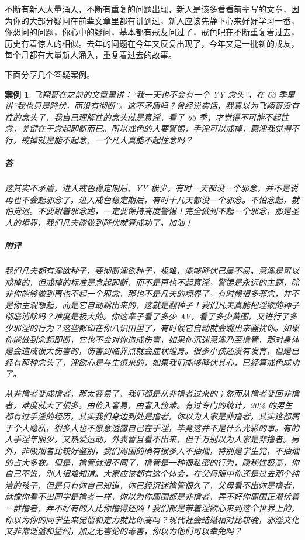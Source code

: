 \documentclass{ctexart}
\newtheorem{case}{案例}
\begin{document}
不断有新人大量涌入，不断有重复的问题出现，新人是该多看看前辈写的文章，因为你的大部分疑问在前辈文章里都有讲到过，新人应该先静下心来好好学习一番，你想问的问题，你心中的疑问，基本都有戒友问过了，戒色吧在不断重复着过去，历史有着惊人的相似。去年的问题在今年又反复出现了，今年又是一批新的戒友，每个月都有大量新人涌入，重复着过去的故事。

下面分享几个答疑案例。

\begin{case}
    飞翔哥在之前的文章里讲：“我一天也不会有一个 YY 念头”，在 63 季里讲“我也只是降伏，而没有彻断”。这不矛盾吗？曾经说实话，我真以为飞翔哥没有性的念头了，我自己理解性的念头就是意淫。看了 63 季，才觉得不可能不起性念，关键在于念起即断而已。所以戒色的人要警惕，手淫可以戒掉，意淫我觉得不行，戒掉就是能不起念，一个凡人真能不起性念吗？
    \subparagraph{答} 这其实不矛盾，进入戒色稳定期后，YY 极少，有时一天都没一个邪念，并不是说再也不会起邪念了。进入戒色稳定期后，有时十几天都没一个邪念。不怕念起，就怕觉迟。不要跟着邪念跑，一定要保持高度警惕！完全做到不起一个邪念，那是圣人的境界，我们凡夫能做到降伏就算成功了。加油！
    \subparagraph{附评} 我们凡夫都有淫欲种子，要彻断淫欲种子，极难，能够降伏已属不易。意淫是可以戒掉的，但戒掉的标准是念起即断，而不是再也不起意淫。警惕是永远的主题，除非你能够做到再也不起一个邪念，那也不是凡夫的境界了。有时候很多邪念，并不是你主观想起，而是它自动跳出来的，这就是翻种子！我们凡夫真能把淫欲的种子彻底消除吗？难度是极大的。你这辈子看了多少 AV，看了多少黄图，又进行了多少邪淫的行为？这些都印在你八识田里了，有时候它自动就会跳出来骚扰你。如果你能做到念起即断，它也不会对你造成伤害，如果你沉迷意淫乃至撸管，那对身体是会造成很大伤害的，伤害到临界点就会症状缠身。很多小孩还没有发育，但是已经有那种念头了，淫欲心是与生俱来的，如果我们能够降伏其心，已经算戒色成功了。

    从非撸者变成撸者，那太容易了，我们都是从非撸者过来的；然而从撸者变回非撸者，难度就大了很多。由俭入奢易，由奢入俭难。有过专门的统计，90\% 的男生都有过手淫的经历，其实我们身边到处是撸者，你以为人家是非撸者，其实这都属于个人隐私，很多人也不愿意透露自己在手淫，毕竟这并不是什么光彩的事。有的人手淫年限少，又热爱运动，外表暂且看不出来，但千万别以为人家是非撸者。另外，非吸烟者比较好鉴别，我们周围的确有很多人不抽烟，特别是学生党，不抽烟的占大多数。但是，撸管就很不同了，撸管是一种很私密的行为，隐秘性极高，你自己不说，别人很难知道。大家应该都有这个体会，在父母眼中你还是过去那个纯洁的孩子，但是只有你自己知道，你已经沉迷撸管很久了，父母看不出你是撸者，就像你看不出同学是撸者一样。你以为你周围都是非撸者，弄不好你周围正潜伏着一群撸者，弄不好有的人比你撸得还凶！我们都是带着淫欲心来到这个世界上的，你以为你的同学生来觉悟和定力就比你高吗？现代社会结婚相对比较晚，邪淫文化又非常泛滥和猛烈，加之无害论的毒害，你以为他们可以幸免吗？


\end{case}
\end{document}
